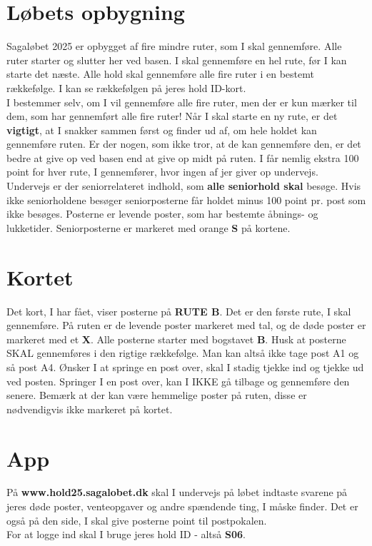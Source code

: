 \section{Løbets opbygning}
Sagaløbet 2025 er opbygget af fire mindre ruter, som I skal gennemføre. Alle ruter starter og slutter her ved basen. I skal gennemføre en hel rute, før I kan starte det næste. Alle hold skal gennemføre alle fire ruter i en bestemt rækkefølge. I kan se rækkefølgen på jeres hold ID-kort.\\\newline
I bestemmer selv, om I vil gennemføre alle fire ruter, men der er kun mærker til dem, som har gennemført alle fire ruter! Når I skal starte en ny rute, er det \textbf{vigtigt}, at I snakker sammen først og finder ud af, om hele holdet kan gennemføre ruten. Er der nogen, som ikke tror, at de kan gennemføre den, er det bedre at give op ved basen end at give op midt på ruten. I får nemlig ekstra 100 point for hver rute, I gennemfører, hvor ingen af jer giver op undervejs.\\
\newline
Undervejs er der seniorrelateret indhold, som \textbf{alle seniorhold skal} besøge. Hvis ikke seniorholdene besøger seniorposterne får holdet minus 100 point pr. post som ikke besøges. Posterne er levende poster, som har bestemte åbnings- og lukketider. Seniorposterne er markeret med orange \textbf{S} på kortene.\\
\newline
\section{Kortet}
Det kort, I har fået, viser posterne på \textbf{RUTE B}. Det er den første rute, I skal gennemføre. På ruten er de levende poster markeret med tal, og de døde poster er markeret med et \textbf{X}. Alle posterne starter med bogstavet \textbf{B}. Husk at posterne SKAL gennemføres i den rigtige rækkefølge. Man kan altså ikke tage post A1 og så post A4. Ønsker I at springe en post over, skal I stadig tjekke ind og tjekke ud ved posten. Springer I en post over, kan I IKKE gå tilbage og gennemføre den senere. Bemærk at der kan være hemmelige poster på ruten, disse er nødvendigvis ikke markeret på kortet.
\section{App}
På \textbf{www.hold25.sagalobet.dk} skal I undervejs på løbet indtaste svarene på jeres døde poster, venteopgaver og andre spændende ting, I måske finder. Det er også på den side, I skal give posterne point til postpokalen.\\
For at logge ind skal I bruge jeres hold ID - altså \textbf{S06}.
\newpage
